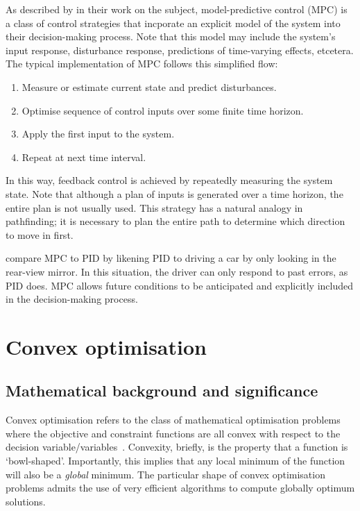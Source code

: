 As described by \textcite{Camacho04} in their work on the subject, model-predictive control (MPC) is a class of control strategies that incporate an explicit model of the system into their decision-making process.
Note that this model may include the system's input response, disturbance response, predictions of time-varying effects, etcetera.
The typical implementation of MPC follows this simplified flow:

\begin{enumerate}
   \item Measure or estimate current state and predict disturbances.
   \item Optimise sequence of control inputs over some finite time horizon.
   \item Apply the first input to the system.
   \item Repeat at next time interval.
\end{enumerate}

In this way, feedback control is achieved by repeatedly measuring the system state.
Note that although a plan of inputs is generated over a time horizon, the entire plan is not usually used.
This strategy has a natural analogy in pathfinding; it is necessary to plan the entire path to determine which direction to move in first.

 compare MPC to PID by likening PID to driving a car by only looking in the rear-view mirror.
In this situation, the driver can only respond to past errors, as PID does.
MPC allows future conditions to be anticipated and explicitly included in the decision-making process.

\section{Convex optimisation}

\subsection{Mathematical background and significance}

Convex optimisation refers to the class of mathematical optimisation problems where the objective and constraint functions are all convex with respect to the decision variable/variables~\cite{Boyd04}.
Convexity, briefly, is the property that a function is `bowl-shaped'.
Importantly, this implies that any local minimum of the function will also be a \emph{global} minimum.
The particular shape of convex optimisation problems admits the use of very efficient algorithms to compute globally optimum solutions.

